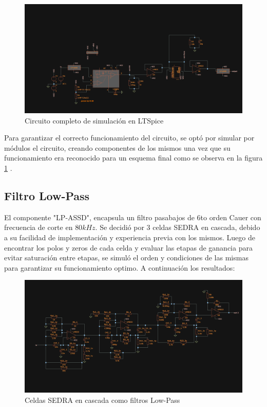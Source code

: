\begin{figure}[H]
    \centering
    \includegraphics[width=0.9\linewidth]{Imagenes Nacho/EsquemaLatex.png}
    \caption{Circuito completo de simulaci\'on en LTSpice}
    \label{fig:EsquemaLatex}
\end{figure}


Para garantizar el correcto funcionamiento del circuito, se opt\'o por simular por m\'odulos el circuito, creando componentes de los mismos una vez que su funcionamiento era reconocido para un esquema final como se observa en la figura \ref{fig:EsquemaLatex} . 

\subsection{Filtro Low-Pass}
El componente "LP-ASSD", encapsula un filtro pasabajos de 6to orden Cauer con frecuencia de corte en $80kHz$. Se decidi\'o por 3 celdas SEDRA en cascada, debido a su facilidad de implementaci\'on y experiencia previa con los mismos. Luego de encontrar los polos y zeros de cada celda y evaluar las etapas de ganancia para evitar saturaci\'on entre etapas, se simul\'o el orden y condiciones de las mismas para garantizar su funcionamiento optimo. A continuaci\'on los resultados:

\begin{figure}[H]
    \centering
    \includegraphics[width=0.8\linewidth]{Imagenes Nacho/EsquemaLatexLowPass.png}
    \caption{Celdas SEDRA en cascada como filtros Low-Pass}
    \label{fig:EsquemaLatexLowPass}
\end{figure}

